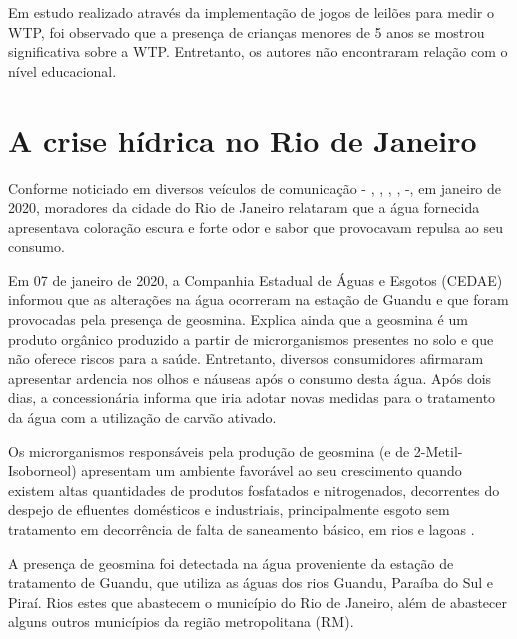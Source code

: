 \documentclass[
  12pt,
]{book}
\begin{document}
Em estudo \citep{Calkins} realizado através da implementação de jogos de leilões para medir o WTP, foi observado que a presença de crianças menores de 5 anos se mostrou significativa sobre a WTP. Entretanto, os autores não encontraram relação com o nível educacional.

\hypertarget{a-crise-huxeddrica-no-rio-de-janeiro}{%
\section{A crise hídrica no Rio de Janeiro}\label{a-crise-huxeddrica-no-rio-de-janeiro}}

Conforme noticiado em diversos veículos de comunicação - \citet{Tavares-Fiocruz}, \citet{Sampaio-Veja}, \citet{Gabriela-uol}, \citet{Ana-ebc}, \citet{radis-fiocruz} -, em janeiro de 2020, moradores da cidade do Rio de Janeiro relataram que a água fornecida apresentava coloração escura e forte odor e sabor que provocavam repulsa ao seu consumo.

Em 07 de janeiro de 2020, a Companhia Estadual de Águas e Esgotos (CEDAE) informou que as alterações na água ocorreram na estação de Guandu e que foram provocadas pela presença de geosmina. Explica ainda que a geosmina é um produto orgânico produzido a partir de microrganismos presentes no solo e que não oferece riscos para a saúde. Entretanto, diversos consumidores afirmaram apresentar ardencia nos olhos e náuseas após o consumo desta água. Após dois dias, a concessionária informa que iria adotar novas medidas para o tratamento da água com a utilização de carvão ativado.

Os microrganismos responsáveis pela produção de geosmina (e de 2-Metil-Isoborneol) apresentam um ambiente favorável ao seu crescimento quando existem altas quantidades de produtos fosfatados e nitrogenados, decorrentes do despejo de efluentes domésticos e industriais, principalmente esgoto sem tratamento em decorrência de falta de saneamento básico, em rios e lagoas \citep{geosmina}.

A presença de geosmina foi detectada na água proveniente da estação de tratamento de Guandu, que utiliza as águas dos rios Guandu, Paraíba do Sul e Piraí. Rios estes que abastecem o município do Rio de Janeiro, além de abastecer alguns outros municípios da região metropolitana (RM).
\end{document}
